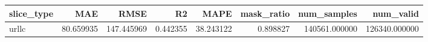 \begin{tabular}{lrrrrrrr}
\toprule
slice_type & MAE & RMSE & R2 & MAPE & mask_ratio & num_samples & num_valid \\
\midrule
urllc & 80.659935 & 147.445969 & 0.442355 & 38.243122 & 0.898827 & 140561.000000 & 126340.000000 \\
\bottomrule
\end{tabular}
